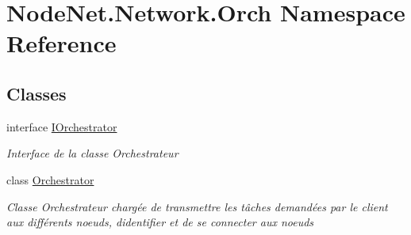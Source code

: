 \hypertarget{namespace_node_net_1_1_network_1_1_orch}{}\section{Node\+Net.\+Network.\+Orch Namespace Reference}
\label{namespace_node_net_1_1_network_1_1_orch}
\subsection*{Classes}
\begin{DoxyCompactItemize}
\item 
interface \hyperlink{interface_node_net_1_1_network_1_1_orch_1_1_i_orchestrator}{I\+Orchestrator}
\begin{DoxyCompactList}\small\item\em Interface de la classe Orchestrateur \end{DoxyCompactList}\item 
class \hyperlink{class_node_net_1_1_network_1_1_orch_1_1_orchestrator}{Orchestrator}
\begin{DoxyCompactList}\small\item\em Classe Orchestrateur chargée de transmettre les tâches demandées par le client aux différents noeuds, d\textquotesingle{}identifier et de se connecter aux noeuds \end{DoxyCompactList}\end{DoxyCompactItemize}
